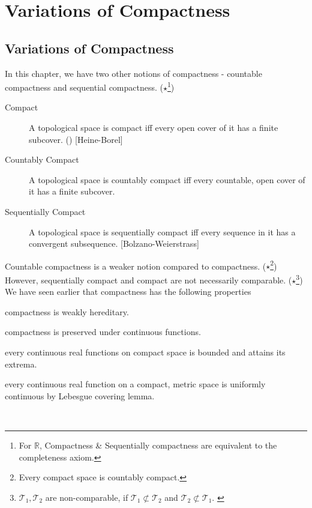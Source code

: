 \section{Variations of Compactness}
\subsection{Variations of Compactness}
	In this chapter, we have two other notions of compactness - countable compactness and sequential compactness.
	($\star$\footnote{For $\mathbb{R}$, Compactness \& Sequentially compactness are equivalent to the completeness axiom.})

	\begin{description}
		\item[Compact] A topological space is compact iff every open cover of it has a finite subcover.
			(\cite[6.1.1]{joshi}) [Heine-Borel]
		\item[Countably Compact] A topological space is countably compact iff every countable, open cover of it has a finite subcover.
			\cite[11.1.1]{joshi}
		\item[Sequentially Compact] A topological space is sequentially compact iff every sequence in it has a convergent subsequence.
			\cite[11.1.8]{joshi} [Bolzano-Weierstrass]
	\end{description}

	Countable compactness is a weaker notion compared to compactness.
	($\star$\footnote{Every compact space is countably compact.})
	However, sequentially compact and compact are not necessarily comparable.
	($\star$\footnote{$\mathcal{T}_1, \mathcal{T}_2$ are non-comparable, if $\mathcal{T}_1 \not\subset \mathcal{T}_2$ and $\mathcal{T}_2 \not\subset \mathcal{T}_1$.
	\cite[4.2.1]{joshi}})\\

	We have seen earlier that compactness has the following properties
\begin{enumerate*}
	\item compactness is weakly hereditary.
		\cite[6.1.10]{joshi}
	\item compactness is preserved under continuous functions.
		\cite[6.1.8]{joshi}
	\item every continuous real functions on compact space is bounded and attains its extrema.
		\cite[6.1.6]{joshi}
	\item every continuous real function on a compact, metric space is uniformly continuous by Lebesgue covering lemma.
		\cite[6.1.7]{joshi}
\end{enumerate*}\\

